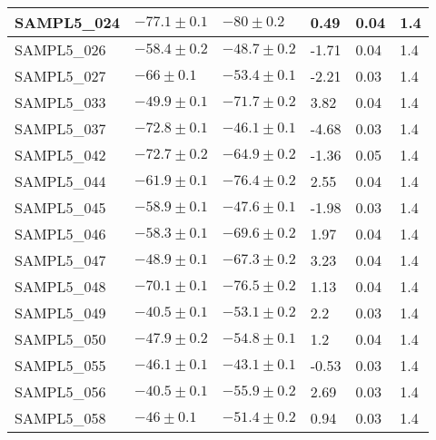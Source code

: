 \documentclass{article}
\begin{document}
\begin{table}[]
\begin{tabular}{|l|l|l|l|l|l|}
SAMPL5\_024 & $ -77.1 \pm 0.1 $               & $ -80 \pm 0.2 $                     & 0.49     & 0.04       & 1.4        \\ \hline
SAMPL5\_026 & $ -58.4 \pm 0.2 $               & $ -48.7 \pm 0.2 $                   & -1.71    & 0.04       & 1.4        \\ \hline
SAMPL5\_027 & $ -66 \pm 0.1 $                 & $ -53.4 \pm 0.1 $                   & -2.21    & 0.03       & 1.4        \\ \hline
SAMPL5\_033 & $ -49.9 \pm 0.1 $               & $ -71.7 \pm 0.2 $                   & 3.82     & 0.04       & 1.4        \\ \hline
SAMPL5\_037 & $ -72.8 \pm 0.1 $               & $ -46.1 \pm 0.1 $                   & -4.68    & 0.03       & 1.4        \\ \hline
SAMPL5\_042 & $ -72.7 \pm 0.2 $               & $ -64.9 \pm 0.2 $                   & -1.36    & 0.05       & 1.4        \\ \hline
SAMPL5\_044 & $ -61.9 \pm 0.1 $               & $ -76.4 \pm 0.2 $                   & 2.55     & 0.04       & 1.4        \\ \hline
SAMPL5\_045 & $ -58.9 \pm 0.1 $               & $ -47.6 \pm 0.1 $                   & -1.98    & 0.03       & 1.4        \\ \hline
SAMPL5\_046 & $ -58.3 \pm 0.1 $               & $ -69.6 \pm 0.2 $                   & 1.97     & 0.04       & 1.4        \\ \hline
SAMPL5\_047 & $ -48.9 \pm 0.1 $               & $ -67.3 \pm 0.2 $                   & 3.23     & 0.04       & 1.4        \\ \hline
SAMPL5\_048 & $ -70.1 \pm 0.1 $               & $ -76.5 \pm 0.2 $                   & 1.13     & 0.04       & 1.4        \\ \hline
SAMPL5\_049 & $ -40.5 \pm 0.1 $               & $ -53.1 \pm 0.2 $                   & 2.2      & 0.03       & 1.4        \\ \hline
SAMPL5\_050 & $ -47.9 \pm 0.2 $               & $ -54.8 \pm 0.1 $                   & 1.2      & 0.04       & 1.4        \\ \hline
SAMPL5\_055 & $ -46.1 \pm 0.1 $               & $ -43.1 \pm 0.1 $                   & -0.53    & 0.03       & 1.4        \\ \hline
SAMPL5\_056 & $ -40.5 \pm 0.1 $               & $ -55.9 \pm 0.2 $                   & 2.69     & 0.03       & 1.4        \\ \hline
SAMPL5\_058 & $ -46 \pm 0.1 $                 & $ -51.4 \pm 0.2 $                   & 0.94     & 0.03       & 1.4        \\ \hline

\end{tabular}
\end{table}
\end{document}
